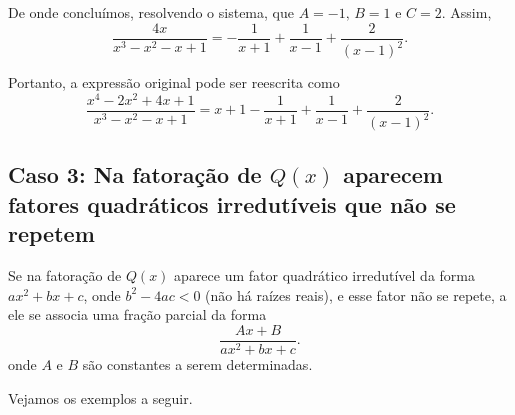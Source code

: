 \begin{exem}
    De onde concluímos, resolvendo o sistema, que $A = -1, \, B = 1$ e $C = 2$. Assim, $$\dfrac{4x}{x^3 - x^2 - x + 1} = -\dfrac{1}{x+1} + \dfrac{1}{x-1} + \dfrac{2}{(x-1)^2}.$$

    Portanto, a expressão original pode ser reescrita como
    $$\dfrac{x^4 - 2x^2 + 4x + 1}{x^3 - x^2 - x + 1} = x + 1 -\dfrac{1}{x+1} + \dfrac{1}{x-1} + \dfrac{2}{(x-1)^2}.$$
 \end{exem}

\subsection{Caso 3: Na fatoração de $Q(x)$ aparecem fatores quadráticos irredutíveis que não se repetem}

Se na fatoração de $Q(x)$ aparece um fator quadrático irredutível da forma $ax^2 + bx + c$, onde $b^2 - 4ac < 0$ (não há raízes reais), e esse fator não se repete, a ele se associa uma fração parcial da forma
$$\dfrac{Ax + B}{ax^2 + bx + c}.$$
onde $A$ e $B$ são constantes a serem determinadas.

Vejamos os exemplos a seguir.

